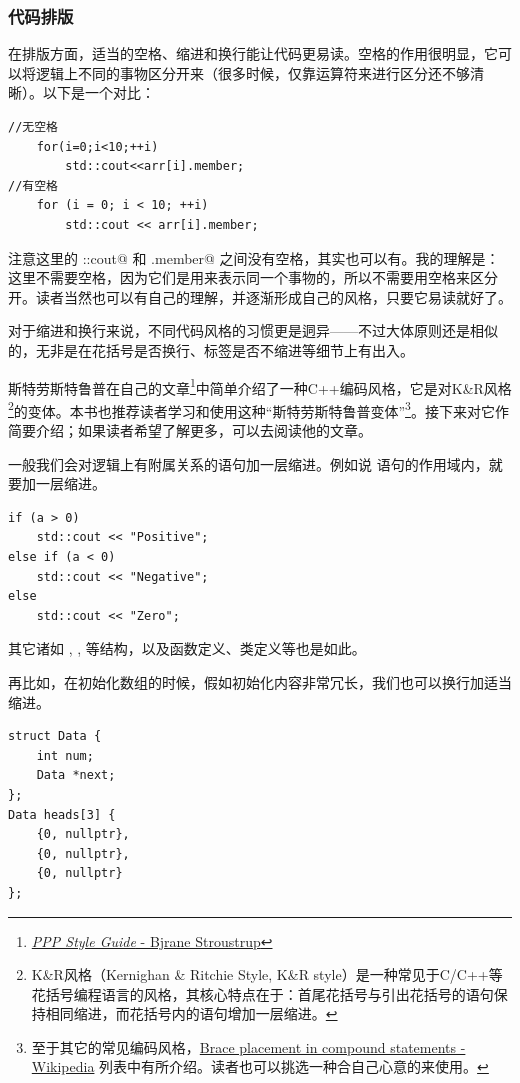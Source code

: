 \subsubsection*{代码排版}
在排版方面，适当的空格、缩进和换行能让代码更易读。空格的作用很明显，它可以将逻辑上不同的事物区分开来（很多时候，仅靠运算符来进行区分还不够清晰）。以下是一个对比：
\begin{lstlisting}
//无空格
    for(i=0;i<10;++i)
        std::cout<<arr[i].member;
//有空格
    for (i = 0; i < 10; ++i)
        std::cout << arr[i].member;
\end{lstlisting}
注意这里的 \lstinline@std::cout@ 和 \lstinline@arr[i].member@ 之间没有空格，其实也可以有。我的理解是：这里不需要空格，因为它们是用来表示同一个事物的，所以不需要用空格来区分开。读者当然也可以有自己的理解，并逐渐形成自己的风格，只要它易读就好了。\par
对于缩进和换行来说，不同代码风格的习惯更是迵异——不过大体原则还是相似的，无非是在花括号是否换行、标签是否不缩进等细节上有出入。\par
斯特劳斯特鲁普在自己的文章\footnote{\href{https://www.stroustrup.com/Programming/PPP-style.pdf}{\textit{PPP Style Guide} - Bjrane Stroustrup}}中简单介绍了一种C++编码风格，它是对K\&R风格\footnote{K\&R风格（Kernighan \& Ritchie Style, K\&R style）是一种常见于C/C++等花括号编程语言的风格，其核心特点在于：首尾花括号与引出花括号的语句保持相同缩进，而花括号内的语句增加一层缩进。}的变体。本书也推荐读者学习和使用这种``斯特劳斯特鲁普变体''\footnote{至于其它的常见编码风格，\href{https://en.wikipedia.org/wiki/Indentation_style\#Brace_placement_in_compound_statements}{Brace placement in compound statements - Wikipedia} 列表中有所介绍。读者也可以挑选一种合自己心意的来使用。}。接下来对它作简要介绍；如果读者希望了解更多，可以去阅读他的文章。\par
一般我们会对逻辑上有附属关系的语句加一层缩进。例如说 \lstinline@if@ 语句的作用域内，就要加一层缩进。
\begin{lstlisting}
if (a > 0)
    std::cout << "Positive";
else if (a < 0)
    std::cout << "Negative";
else
    std::cout << "Zero";
\end{lstlisting}
其它诸如 \lstinline@for@, \lstinline@while@, \lstinline@switch@ 等结构，以及函数定义、类定义等也是如此。\par
再比如，在初始化数组的时候，假如初始化内容非常冗长，我们也可以换行加适当缩进。
\begin{lstlisting}
struct Data {
    int num;
    Data *next;
};
Data heads[3] {
    {0, nullptr},
    {0, nullptr},
    {0, nullptr}
};
\end{lstlisting}
